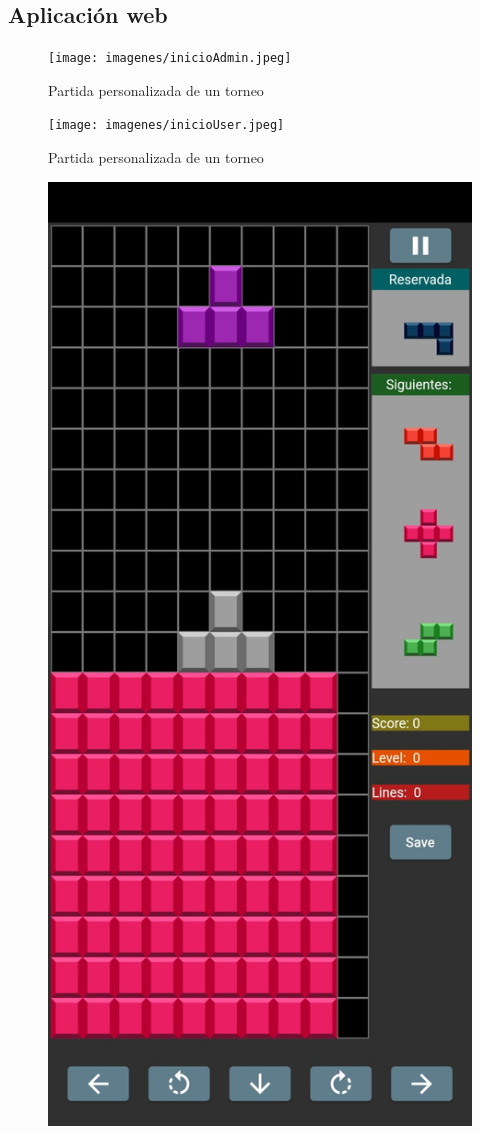 \documentclass{article}
\begin{document}
\subsection{Aplicación web}
\begin{figure}[H]
  \texttt{[image: imagenes/inicioAdmin.jpeg]}
  \caption{Partida personalizada de un torneo} 
\end{figure}

\begin{figure}[H]
  \texttt{[image: imagenes/inicioUser.jpeg]}
  \caption{Partida personalizada de un torneo} 
\end{figure}

\begin{figure}[H]
  \includegraphics[width=\textwidth]{imagenes/piezasRosas.jpeg}

\end{figure}
\end{document}
